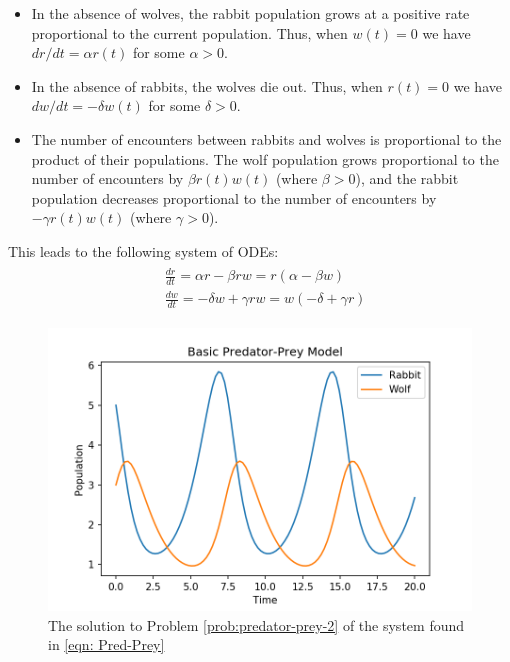 \begin{itemize}
\item In the absence of wolves, the rabbit population grows at a positive rate proportional to the current population. Thus, when $w(t) = 0$ we have $dr/dt = \alpha r(t)$ for some $\alpha > 0$.
\item In the absence of rabbits, the wolves die out. Thus, when $r(t) = 0$ we have $dw/dt = -\delta w(t)$ for some $\delta > 0$.
\item The number of encounters between rabbits and wolves is proportional to the product of their populations. The wolf population grows proportional to the number of encounters by $\beta r(t)w(t)$ (where $\beta > 0$), and the rabbit population decreases proportional to the number of encounters by $-\gamma r(t)w(t)$ (where $\gamma > 0$). 
\end{itemize}

This leads to the following system of ODEs: 
\begin{align}
	\begin{split}
	&\frac{dr}{dt} = \alpha r - \beta r w = r(\alpha - \beta w)\\
	&\frac{dw}{dt} = -\delta w + \gamma r w = w(-\delta + \gamma r)
	\end{split}\label{eqn: Pred-Prey}
\end{align}

\begin{figure}[h]
\centering
\includegraphics[width=\textwidth]{figures/Predator_Prey.png}
\caption{The solution to Problem \ref{prob:predator-prey-2} of the system found in \eqref{eqn: Pred-Prey}}
\label{fig: Pred-Prey}
\end{figure}



